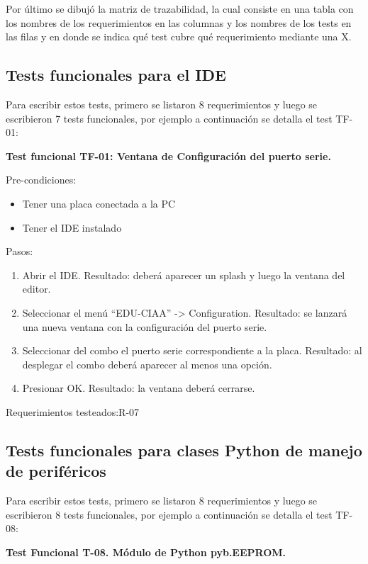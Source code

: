 Por último se dibujó la matriz de trazabilidad, la cual consiste en una tabla con los nombres de los requerimientos en las columnas y los nombres de los tests en las filas y en donde se indica qué test cubre qué requerimiento mediante una X.


\subsection{Tests funcionales para el IDE}

Para escribir estos tests, primero se listaron 8 requerimientos y luego se escribieron 7 tests funcionales, por ejemplo a continuación se detalla el test TF-01:

\textbf{Test funcional TF-01: Ventana de Configuración del puerto serie.}

Pre-condiciones:
\begin{itemize}
	\item Tener una placa conectada a la PC
	\item Tener el IDE instalado
\end{itemize}

Pasos:
\begin{enumerate}
	\item Abrir el IDE. Resultado: deberá aparecer un splash y luego la ventana del editor.
	\item Seleccionar el menú “EDU-CIAA” -> Configuration. Resultado: se lanzará una nueva ventana con la configuración del puerto serie.
	\item Seleccionar del combo el puerto serie correspondiente a la placa. Resultado: al desplegar el combo deberá aparecer al menos una opción.
	\item Presionar OK. Resultado: la ventana deberá cerrarse.
\end{enumerate}
	
Requerimientos testeados:R-07


\subsection{Tests funcionales para clases Python de manejo de periféricos}

Para escribir estos tests, primero se listaron 8 requerimientos y luego se escribieron 8 tests funcionales, por ejemplo a continuación se detalla el test TF-08:

\textbf{Test Funcional T-08. Módulo de Python pyb.EEPROM.}

